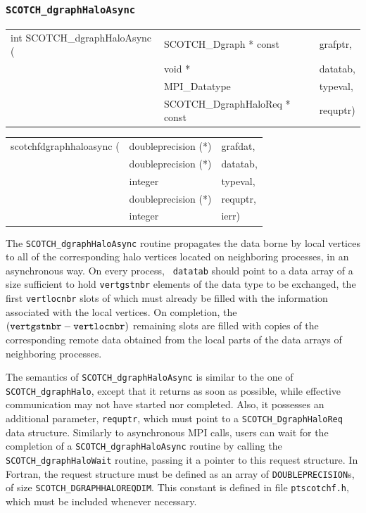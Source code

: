 \subsubsection{{\tt SCOTCH\_dgraphHaloAsync}}
\label{sec-lib-dgraphhaloasync}

\begin{itemize}
\progsyn

{\tt\begin{tabular}{l@{}ll}

int SCOTCH\_dgraphHaloAsync ( & SCOTCH\_Dgraph * const        & grafptr, \\
                              & void *                        & datatab, \\
                              & MPI\_Datatype                 & typeval, \\
                              & SCOTCH\_DgraphHaloReq * const & requptr)
\end{tabular}}

{\tt\begin{tabular}{l@{}ll}
scotchfdgraphhaloasync ( & doubleprecision (*) & grafdat, \\
                         & doubleprecision (*) & datatab, \\
                         & integer             & typeval, \\
                         & doubleprecision (*) & requptr, \\
                         & integer             & ierr)
\end{tabular}}

\progdes

The {\tt SCOTCH\_dgraphHaloAsync} routine propagates the data borne by
local vertices to all of the corresponding halo vertices located on
neighboring processes, in an asynchronous way. On every process, {\tt
datatab} should point to a data array of a size sufficient to hold
{\tt vert\lbt gst\lbt nbr} elements of the data type to be exchanged,
the first {\tt vertlocnbr} slots of which must already be filled with
the information associated with the local vertices. On completion, the
$({\tt vert\lbt gst\lbt nbr} - {\tt vert\lbt loc\lbt nbr})$ remaining
slots are filled with copies of the corresponding remote data obtained
from the local parts of the data arrays of neighboring processes.

The semantics of {\tt SCOTCH\_dgraphHaloAsync} is similar to the one
of {\tt SCOTCH\_dgraph\lbt Halo}, except that it returns as soon as
possible, while effective communication may not have started nor
completed. Also, it possesses an additional parameter, {\tt requptr},
which must point to a {\tt SCOTCH\_\lbt Dgraph\lbt Halo\lbt Req} data
structure. Similarly to asynchronous MPI calls, users can wait for the
completion of a {\tt SCOTCH\_dgraph\lbt Halo\lbt Async} routine by
calling the {\tt SCOTCH\_dgraph\lbt Halo\lbt Wait} routine, passing it
a pointer to this request structure. In Fortran, the request structure
must be defined as an array of {\tt DOUBLEPRECISION}s, of size
{\tt SCOTCH\_\lbt DGRAPH\lbt HALO\lbt REQDIM}. This constant is
defined in file {\tt ptscotchf.h}, which must be included whenever
necessary.


\end{itemize}
